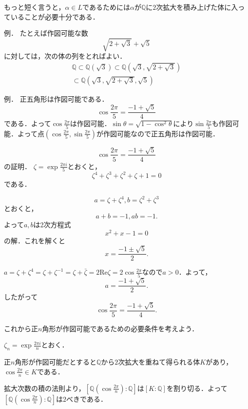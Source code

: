 \documentclass[dvipdfmx,17pt]{beamer}
\theoremstyle{plain}
\newcommand{\Q}{\mathbb{Q}}
\begin{document}
\begin{frame}
もっと短く言うと，$\alpha \in L$であるためには$\alpha$が$\Q$に$2$次拡大を積み上げた体に入っていることが必要十分である．
\end{frame}

\begin{frame}
例． たとえば作図可能な数
\[ \sqrt{2+\sqrt{3}} + \sqrt{5} \]
に対しては，次の体の列をとればよい．
\begin{align*}
\Q \subset \Q(\sqrt{3}) \subset \Q(\sqrt{3}, \sqrt{2+\sqrt{3}}) \\ 
\subset \Q(\sqrt{3}, \sqrt{2+\sqrt{3}}, \sqrt{5}) \end{align*}


\end{frame}

\begin{frame}
例． 正五角形は作図可能である．
\[ \cos \frac{2 \pi}{5} = \frac{-1 + \sqrt{5}}{4} \]
である．よって$\cos \frac{2 \pi}{5}$は作図可能．$\sin \theta = \sqrt{1 - \cos^2 \theta}$により$\sin \frac{2 \pi}{5}$も作図可能．よって点$(\cos \frac{2 \pi}{5}, \sin \frac{2 \pi}{5})$が作図可能なので正五角形は作図可能．
\end{frame}

\begin{frame}
\[ \cos \frac{2 \pi}{5} = \frac{-1 + \sqrt{5}}{4} \]
の証明．
$\zeta = \exp \frac{2 \pi i}{5}$とおくと，
\[ \zeta^4 + \zeta^3 + \zeta^2 + \zeta + 1 = 0 \]
である．
\end{frame}

\begin{frame}
\[ a = \zeta + \zeta^4, b = \zeta^2 + \zeta^3 \]
とおくと，
\[ a + b = -1, ab = -1. \]
よって$a, b$は2次方程式
\[ x^2 + x - 1 = 0 \]
の解．これを解くと
\[ x = \frac{-1 \pm \sqrt{5}}{2}. \]
\end{frame}

\begin{frame}
$a =  \zeta + \zeta^4 = \zeta + \zeta^{-1} = \zeta + \bar{\zeta} = 2 \mathrm{Re} \zeta = 2 \cos \frac{2 \pi}{5} $なので$a > 0$．よって，
\[a = \frac{-1 + \sqrt{5}}{2}.\]
したがって
\[\cos \frac{2 \pi}{5} = \frac{-1 + \sqrt{5}}{4}.\]
\end{frame}

\begin{frame}
これから正$n$角形が作図可能であるための必要条件を考えよう．

$\zeta_n = \exp \frac{2 \pi i}{n}$とおく．

正$n$角形が作図可能だとすると$\Q$から$2$次拡大を重ねて得られる体$K$があり，$\cos \frac{2 \pi}{n} \in K$である．

拡大次数の積の法則より，$[\Q(\cos \frac{2 \pi}{n}) : \Q]$は$[K : \Q]$を割り切る．よって$[\Q(\cos \frac{2 \pi}{n}) : \Q]$は$2$べきである．

\end{frame}
\end{document}
